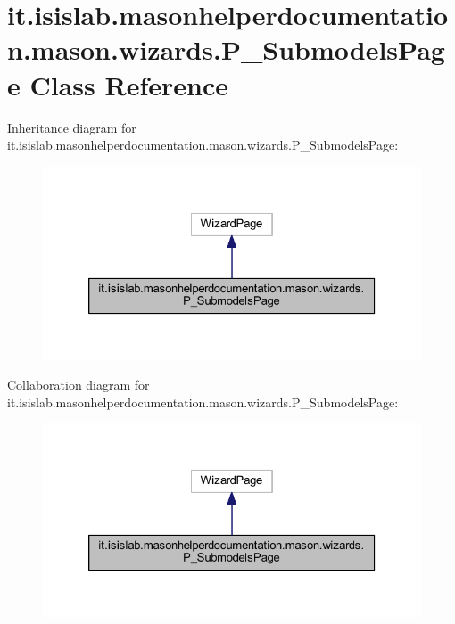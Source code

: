 \hypertarget{classit_1_1isislab_1_1masonhelperdocumentation_1_1mason_1_1wizards_1_1_p___submodels_page}{\section{it.\-isislab.\-masonhelperdocumentation.\-mason.\-wizards.\-P\-\_\-\-Submodels\-Page Class Reference}
\label{classit_1_1isislab_1_1masonhelperdocumentation_1_1mason_1_1wizards_1_1_p___submodels_page}
}


Inheritance diagram for it.\-isislab.\-masonhelperdocumentation.\-mason.\-wizards.\-P\-\_\-\-Submodels\-Page\-:
\nopagebreak
\begin{figure}[H]
\begin{center}
\leavevmode
\includegraphics[width=326pt]{classit_1_1isislab_1_1masonhelperdocumentation_1_1mason_1_1wizards_1_1_p___submodels_page__inherit__graph}
\end{center}
\end{figure}


Collaboration diagram for it.\-isislab.\-masonhelperdocumentation.\-mason.\-wizards.\-P\-\_\-\-Submodels\-Page\-:
\nopagebreak
\begin{figure}[H]
\begin{center}
\leavevmode
\includegraphics[width=326pt]{classit_1_1isislab_1_1masonhelperdocumentation_1_1mason_1_1wizards_1_1_p___submodels_page__coll__graph}
\end{center}
\end{figure}
